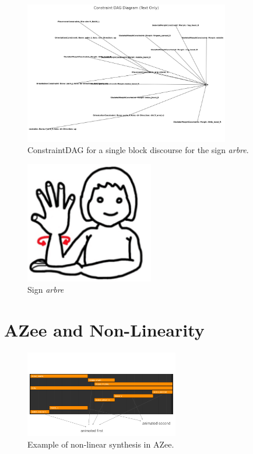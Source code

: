 \documentclass[../../main.tex]{subfiles}
\begin{document}
\begin{figure}[h]
    \centering
    \includegraphics[width=0.8\textwidth]{chapters/multi_track/images/constraint_dag.png}
    \caption{ConstraintDAG for a single block discourse for the sign \emph{arbre}.}
    \label{fig:constraint_dag_tree}
\end{figure}

\begin{figure}[h]
    \centering
    \includegraphics[width=0.5\textwidth]{chapters/multi_track/images/tree.png}
    \caption{Sign \emph{arbre}~\cite{boutetetal}}
    \label{fig:tree_sign}
\end{figure}

\section{AZee and Non-Linearity}
\label{ch:multi_track:azee_nl}

\begin{figure}[H]
    \centering
    \includegraphics[width=0.6\textwidth]{chapters/multi_track/images/example_azee_non_linear.png}
    \caption{Example of non-linear synthesis in AZee.}
    \label{fig:example_azee_non_linear}
\end{figure}
\end{document}

